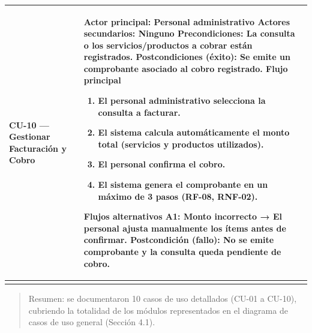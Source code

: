 \documentclass[
]{article}
\newcounter{none} %
\begin{document}
{\def\LTcaptype{none} %
\begin{longtable}[]{|
  >{\raggedright\arraybackslash}p{}|
  >{\raggedright\arraybackslash}p{}|}
\hline
\begin{minipage}[b]{\linewidth}\raggedright
\textbf{CU-10 --- Gestionar Facturación y Cobro}
\end{minipage} & \begin{minipage}[b]{\linewidth}\raggedright
\textbf{Actor principal:} Personal administrativo \textbf{Actores
secundarios:} Ninguno \textbf{Precondiciones:} La consulta o los
servicios/productos a cobrar están registrados. \textbf{Postcondiciones (éxito):} Se emite un comprobante asociado al
cobro registrado. \textbf{Flujo principal}

\begin{enumerate}
\def\labelenumi{\arabic{enumi}.}
\item
  El personal administrativo selecciona la consulta a facturar.
\item
  El sistema calcula automáticamente el monto total (servicios y
  productos utilizados).
\item
  El personal confirma el cobro.
\item
  El sistema genera el comprobante en un máximo de 3 pasos (RF-08,
  RNF-02).
\end{enumerate}

\textbf{Flujos alternativos} A1: Monto incorrecto → El personal ajusta manualmente los ítems antes de
confirmar. \textbf{Postcondición (fallo):} No se emite comprobante y la consulta
queda pendiente de cobro.
\end{minipage} \\
\hline
\endhead
\hline
\endlastfoot
\end{longtable}
}

\begin{quote}
Resumen: se documentaron 10 casos de uso detallados (CU-01 a CU-10),
cubriendo la totalidad de los módulos representados en el diagrama de
casos de uso general (Sección 4.1).
\end{quote}
\end{document}
